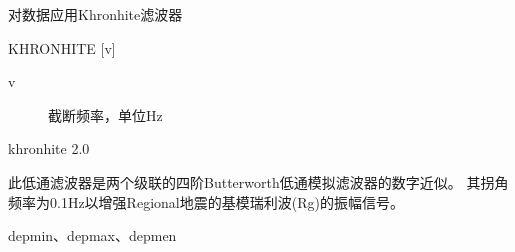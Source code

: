 \label{cmd:khronhite}

对数据应用Khronhite滤波器

\begin{SACSTX}
KHRONHITE [v]
\end{SACSTX}

\begin{description}
\item [v] 截断频率，单位Hz
\end{description}

\begin{SACDFT}
khronhite 2.0
\end{SACDFT}

此低通滤波器是两个级联的四阶Butterworth低通模拟滤波器的数字近似。
其拐角频率为0.1Hz以增强Regional地震的基模瑞利波(Rg)的振幅信号。

depmin、depmax、depmen
